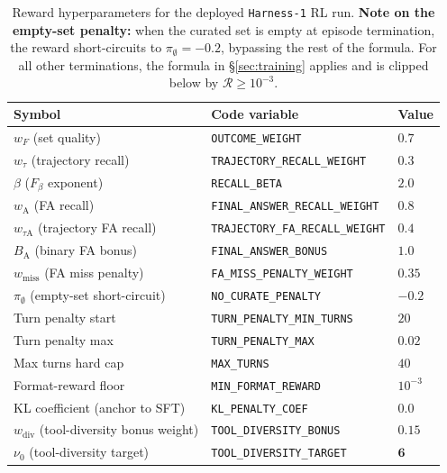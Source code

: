 \documentclass{article}
\newcommand{\sys}{\texttt{Harness-1}\xspace}
\begin{document}
\begin{table}[ht]
\centering
\small
\caption{Reward hyperparameters for the deployed \sys RL run.
\textbf{Note on the empty-set penalty:} when the curated set is
empty at episode termination, the reward short-circuits to
$\pi_\emptyset = -0.2$, bypassing the rest of the formula. For
all other terminations, the formula in §\ref{sec:training} applies and
is clipped below by $\mathcal{R} \geq 10^{-3}$.}
\label{tab:reward-hp}
\begin{tabular}{lll}
\toprule
\textbf{Symbol} & \textbf{Code variable} & \textbf{Value} \\
\midrule
$w_F$ (set quality) & \texttt{OUTCOME\_WEIGHT} & $0.7$ \\
$w_\tau$ (trajectory recall) & \texttt{TRAJECTORY\_RECALL\_WEIGHT} & $0.3$ \\
$\beta$ ($F_\beta$ exponent) & \texttt{RECALL\_BETA} & $2.0$ \\
$w_{\mathrm{A}}$ (FA recall) & \texttt{FINAL\_ANSWER\_RECALL\_WEIGHT} & $0.8$ \\
$w_{\tau\mathrm{A}}$ (trajectory FA recall) & \texttt{TRAJECTORY\_FA\_RECALL\_WEIGHT} & $0.4$ \\
$B_{\mathrm{A}}$ (binary FA bonus) & \texttt{FINAL\_ANSWER\_BONUS} & $1.0$ \\
$w_{\mathrm{miss}}$ (FA miss penalty) & \texttt{FA\_MISS\_PENALTY\_WEIGHT} & $0.35$ \\
$\pi_\emptyset$ (empty-set short-circuit) & \texttt{NO\_CURATE\_PENALTY} & $-0.2$ \\
Turn penalty start & \texttt{TURN\_PENALTY\_MIN\_TURNS} & $20$ \\
Turn penalty max & \texttt{TURN\_PENALTY\_MAX} & $0.02$ \\
Max turns hard cap & \texttt{MAX\_TURNS} & $40$ \\
Format-reward floor & \texttt{MIN\_FORMAT\_REWARD} & $10^{-3}$ \\
KL coefficient (anchor to SFT) & \texttt{KL\_PENALTY\_COEF} & $0.0$ \\
$w_{\mathrm{div}}$ (tool-diversity bonus weight) & \texttt{TOOL\_DIVERSITY\_BONUS} & $\mathbf{0.15}$ \\
$\nu_0$ (tool-diversity target) & \texttt{TOOL\_DIVERSITY\_TARGET} & $\mathbf{6}$ \\
\bottomrule
\end{tabular}
\end{table}
\end{document}
